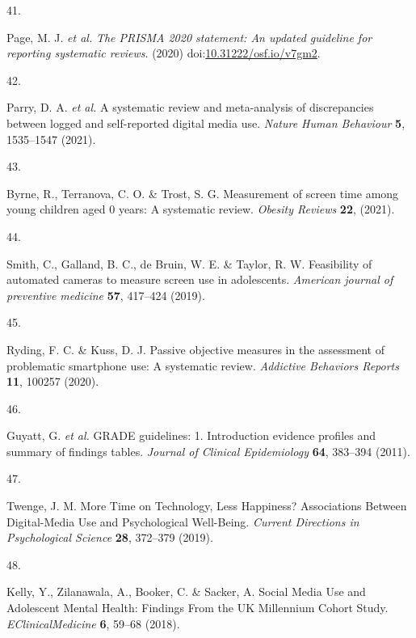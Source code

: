 \documentclass[
  english,
  man]{apa6}
\newlength{\cslhangindent}
\newlength{\csllabelwidth}
\newenvironment{CSLReferences}[2] %
 {%
  \setlength{\parindent}{0pt}
  \ifodd #1 \everypar{\setlength{\hangindent}{\cslhangindent}}\ignorespaces\fi
  \ifnum #2 > 0
  \setlength{\parskip}{#2\baselineskip}
  \fi
 }%
 {}
\newcommand{\CSLLeftMargin}[1]{\parbox[t]{\csllabelwidth}{#1}}
\newcommand{\CSLRightInline}[1]{\parbox[t]{\linewidth - \csllabelwidth}{#1}\break}
\begin{document}
\begin{CSLReferences}{0}{0}
\leavevmode{}%
\CSLLeftMargin{41. }
\CSLRightInline{Page, M. J. \emph{et al.} \emph{The {PRISMA} 2020 statement: An updated guideline for reporting systematic reviews}. (2020) doi:\href{https://doi.org/10.31222/osf.io/v7gm2}{10.31222/osf.io/v7gm2}.}

\leavevmode{}%
\CSLLeftMargin{42. }
\CSLRightInline{Parry, D. A. \emph{et al.} A systematic review and meta-analysis of discrepancies between logged and self-reported digital media use. \emph{Nature Human Behaviour} \textbf{5}, 1535--1547 (2021).}

\leavevmode{}%
\CSLLeftMargin{43. }
\CSLRightInline{Byrne, R., Terranova, C. O. \& Trost, S. G. Measurement of screen time among young children aged 0\textendash 6 years: {A} systematic review. \emph{Obesity Reviews} \textbf{22}, (2021).}

\leavevmode{}%
\CSLLeftMargin{44. }
\CSLRightInline{Smith, C., Galland, B. C., de Bruin, W. E. \& Taylor, R. W. Feasibility of automated cameras to measure screen use in adolescents. \emph{American journal of preventive medicine} \textbf{57}, 417--424 (2019).}

\leavevmode{}%
\CSLLeftMargin{45. }
\CSLRightInline{Ryding, F. C. \& Kuss, D. J. Passive objective measures in the assessment of problematic smartphone use: {A} systematic review. \emph{Addictive Behaviors Reports} \textbf{11}, 100257 (2020).}

\leavevmode{}%
\CSLLeftMargin{46. }
\CSLRightInline{Guyatt, G. \emph{et al.} {GRADE} guidelines: 1. {Introduction}\textemdash{{GRADE}} evidence profiles and summary of findings tables. \emph{Journal of Clinical Epidemiology} \textbf{64}, 383--394 (2011).}

\leavevmode{}%
\CSLLeftMargin{47. }
\CSLRightInline{Twenge, J. M. More {Time} on {Technology}, {Less Happiness}? {Associations Between Digital-Media Use} and {Psychological Well-Being}. \emph{Current Directions in Psychological Science} \textbf{28}, 372--379 (2019).}

\leavevmode{}%
\CSLLeftMargin{48. }
\CSLRightInline{Kelly, Y., Zilanawala, A., Booker, C. \& Sacker, A. Social {Media Use} and {Adolescent Mental Health}: {Findings From} the {UK Millennium Cohort Study}. \emph{EClinicalMedicine} \textbf{6}, 59--68 (2018).}


\end{CSLReferences}
\end{document}
